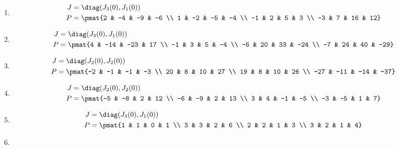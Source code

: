 \begin{enumerate}
\item

\begin{align*}
J &= \diag(J_{3}(0), J_{1}(0))\\
P &= \pmat{2 & -4 & -9 & -6 \\ 1 & -2 & -5 & -4 \\ -1 & 2 & 5 & 3 \\ -3 & 7 & 16 & 12}
\end{align*}

\item

\begin{align*}
J &= \diag(J_{3}(0), J_{1}(0))\\
P &= \pmat{4 & -14 & -23 & 17 \\ -1 & 3 & 5 & -4 \\ -6 & 20 & 33 & -24 \\ -7 & 24 & 40 & -29}
\end{align*}

\item

\begin{align*}
J &= \diag(J_{2}(0), J_{2}(0))\\
P &= \pmat{-2 & -1 & -1 & -3 \\ 20 & 8 & 10 & 27 \\ 19 & 8 & 10 & 26 \\ -27 & -11 & -14 & -37}
\end{align*}

\item

\begin{align*}
J &= \diag(J_{2}(0), J_{2}(0))\\
P &= \pmat{-5 & -8 & 2 & 12 \\ -6 & -9 & 2 & 13 \\ 3 & 4 & -1 & -5 \\ -3 & -5 & 1 & 7}
\end{align*}

\item

\begin{align*}
J &= \diag(J_{3}(0), J_{1}(0))\\
P &= \pmat{1 & 1 & 0 & 1 \\ 3 & 3 & 2 & 6 \\ 2 & 2 & 1 & 3 \\ 3 & 2 & 1 & 4}
\end{align*}

\item


\end{enumerate}
